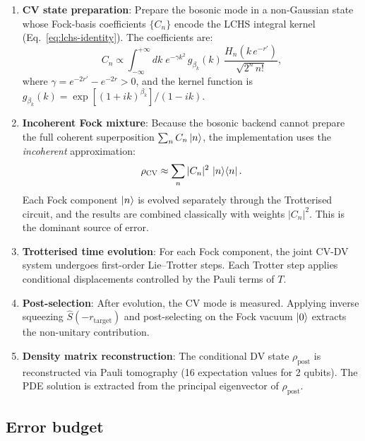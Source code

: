 \documentclass[11pt]{article}
\newcommand{\Sop}{\hat{S}}
\begin{document}
\begin{enumerate}[nosep]
\item \textbf{CV state preparation}: Prepare the bosonic mode in a
  non-Gaussian state whose Fock-basis coefficients $\{C_n\}$ encode the
  LCHS integral kernel (Eq.~\ref{eq:lchs-identity}).
  The coefficients are:
  \begin{equation}\label{eq:cn-lchs}
  C_n \propto \int_{-\infty}^{+\infty} dk\;
  e^{-\gamma k^2}\, g_{\beta_k}(k)\,
  \frac{H_n(k\, e^{-r'})}{\sqrt{2^n\, n!}},
  \end{equation}
  where $\gamma = e^{-2r'} - e^{-2r} > 0$, and the kernel function is
  $g_{\beta_k}(k) = \exp[(1+ik)^{\beta_k}]/(1-ik)$.

\item \textbf{Incoherent Fock mixture}: Because the bosonic backend
  cannot prepare the full coherent superposition $\sum_n C_n\ket{n}$,
  the implementation uses the \emph{incoherent} approximation:
  \begin{equation}
  \rho_{\mathrm{CV}} \approx \sum_n |C_n|^2\, \ket{n}\!\bra{n}.
  \end{equation}
  Each Fock component $\ket{n}$ is evolved separately through the
  Trotterised circuit, and the results are combined classically with
  weights $|C_n|^2$.  This is the dominant source of error.

\item \textbf{Trotterised time evolution}: For each Fock component, the
  joint CV-DV system undergoes first-order Lie--Trotter steps.  Each
  Trotter step applies conditional displacements controlled by the Pauli
  terms of $T$.

\item \textbf{Post-selection}: After evolution, the CV mode is measured.
  Applying inverse squeezing $\Sop(-r_{\mathrm{target}})$ and
  post-selecting on the Fock vacuum $\ket{0}$ extracts the non-unitary
  contribution.

\item \textbf{Density matrix reconstruction}: The conditional DV state
  $\rho_{\mathrm{post}}$ is reconstructed via Pauli tomography (16
  expectation values for 2 qubits).  The PDE solution is extracted from
  the principal eigenvector of $\rho_{\mathrm{post}}$.
\end{enumerate}

\subsection{Error budget}
\end{document}

